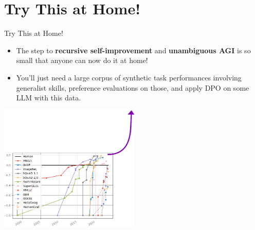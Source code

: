 \documentclass{beamer}
\begin{document}
\section{Try This at Home!}
\begin{frame}{Try This at Home!}
  \begin{itemize}
   \item The step to \textbf{recursive self-improvement} and \textbf{unambiguous AGI} is so small that anyone can now do it at home!
   \item You'll just need a large corpus of synthetic task performances involving generalist skills, preference evaluations on those, and apply DPO on some LLM with this data.
  \end{itemize}
  \hspace{2cm}\includegraphics[height=6cm]{recursive2.png}
\end{frame}
\end{document}

